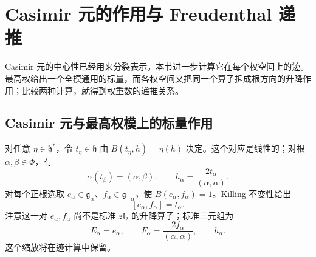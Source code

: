%
%

\section{Casimir 元的作用与 Freudenthal 递推}
\label{b5:sec:1902}

Casimir 元的中心性已经用来分裂表示。本节进一步计算它在每个权空间上的迹。最高权给出一个全模通用的标量，而各权空间又把同一个算子拆成根方向的升降作用；比较两种计算，就得到权重数的递推关系。

\subsection{Casimir 元与最高权模上的标量作用}
\label{b5:subsec:1902:01}

对任意 \(\eta\in\mathfrak h^*\)，令 \(t_\eta\in\mathfrak h\) 由 \(B(t_\eta,h)=\eta(h)\) 决定。这个对应是线性的；对根 \(\alpha,\beta\in\Phi\)，有
\[
	\alpha(t_\beta)=(\alpha,\beta),\qquad h_\alpha=\frac{2t_\alpha}{(\alpha,\alpha)}.
\]
对每个正根选取 \(e_\alpha\in\mathfrak g_\alpha\)、\(f_\alpha\in\mathfrak g_{-\alpha}\)，使 \(B(e_\alpha,f_\alpha)=1\)。Killing 不变性给出
\[
	[e_\alpha,f_\alpha]=t_\alpha.
\]
注意这一对 \(e_\alpha,f_\alpha\) 尚不是标准 \(\mathfrak{sl}_2\) 的升降算子；标准三元组为
\[
	E_\alpha=e_\alpha,\qquad F_\alpha=\frac{2f_\alpha}{(\alpha,\alpha)},\qquad h_\alpha.
\]
这个缩放将在迹计算中保留。


